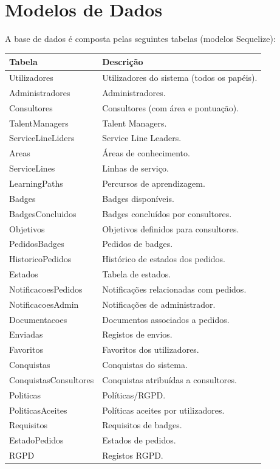 \documentclass[12pt,a4paper]{article}
\begin{document}
\newpage

\section{Modelos de Dados}

A base de dados é composta pelas seguintes tabelas (modelos Sequelize):

\begin{longtable}{@{}ll@{}}
    \toprule
    \textbf{Tabela} & \textbf{Descrição} \\
    \midrule
    \endhead
    \bottomrule
    \endfoot

    Utilizadores & Utilizadores do sistema (todos os papéis). \\
    Administradores & Administradores. \\
    Consultores & Consultores (com área e pontuação). \\
    TalentManagers & Talent Managers. \\
    ServiceLineLiders & Service Line Leaders. \\
    Areas & Áreas de conhecimento. \\
    ServiceLines & Linhas de serviço. \\
    LearningPaths & Percursos de aprendizagem. \\
    Badges & Badges disponíveis. \\
    BadgesConcluidos & Badges concluídos por consultores. \\
    Objetivos & Objetivos definidos para consultores. \\
    PedidosBadges & Pedidos de badges. \\
    HistoricoPedidos & Histórico de estados dos pedidos. \\
    Estados & Tabela de estados. \\
    NotificacoesPedidos & Notificações relacionadas com pedidos. \\
    NotificacoesAdmin & Notificações de administrador. \\
    Documentacoes & Documentos associados a pedidos. \\
    Enviadas & Registos de envios. \\
    Favoritos & Favoritos dos utilizadores. \\
    Conquistas & Conquistas do sistema. \\
    ConquistasConsultores & Conquistas atribuídas a consultores. \\
    Politicas & Políticas/RGPD. \\
    PoliticasAceites & Políticas aceites por utilizadores. \\
    Requisitos & Requisitos de badges. \\
    EstadoPedidos & Estados de pedidos. \\
    RGPD & Registos RGPD. \\
\end{longtable}
\end{document}
